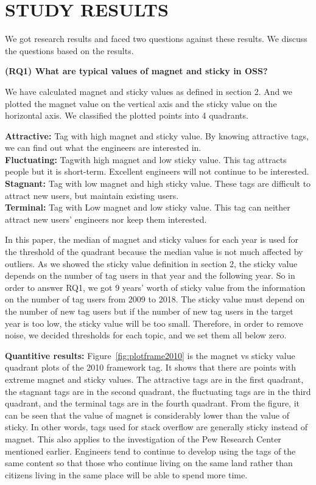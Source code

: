 \documentclass[conference]{IEEEtran}
\begin{document}
\section{STUDY RESULTS} %
We got research results and faced two questions against these results. We discuss the questions based on the results.
\smallskip
\smallskip

\textbf{(RQ1) What are typical values of magnet and sticky in OSS?}
\smallskip

We have calculated magnet and sticky values as defined in section 2. And we plotted the magnet value on the vertical axis and the sticky value on the horizontal axis. We classified the plotted points into 4 quadrants.
\smallskip
\smallskip

\textbf{Attractive:} Tag with high magnet and sticky value. By knowing attractive tags, we can find out what the engineers are interested in.\\
\textbf{Fluctuating:} Tagwith high magnet and low sticky value. This tag attracts people but it is short-term. Excellent engineers will not continue to be interested.\\
\textbf{Stagnant:} Tag with low magnet and high sticky value. These tags are difficult to attract new users, but maintain existing users.\\
\textbf{Terminal:} Tag with Low magnet and low sticky value. This tag can neither attract new users' engineers nor keep them interested.
\smallskip
\smallskip

In this paper, the median of magnet and sticky values for each year is used for the threshold of the quadrant because the median value is not much affected by outliers. As we showed the sticky value definition in section 2, the sticky value depends on the number of tag users in that year and the following year. So in order to answer RQ1, we got 9 years' worth of sticky value from the information on the number of tag users from 2009 to 2018. The sticky value must depend on the number of new tag users but if the number of new tag users in the target year is too low, the sticky value will be too small. Therefore, in order to remove noise, we decided thresholds for each topic, and we set them all below zero. 
\medskip


\textbf{Quantitive results:}
Figure~\ref{fig:plotframe2010} is the magnet vs sticky value quadrant plots of the 2010 framework tag. It shows that there are points with extreme magnet and sticky values. The attractive tags are in the first quadrant, the stagnant tags are in the second quadrant, the fluctuating tags are in the third quadrant, and the terminal tags are in the fourth quadrant. From the figure, it can be seen that the value of magnet is considerably lower than the value of sticky. In other words, tags used for stack overflow are generally sticky instead of magnet. This also applies to the investigation of the Pew Research Center mentioned earlier. Engineers tend to continue to develop using the tags of the same content so that those who continue living on the same land rather than citizens living in the same place will be able to spend more time. 
\smallskip
\smallskip
\end{document}

